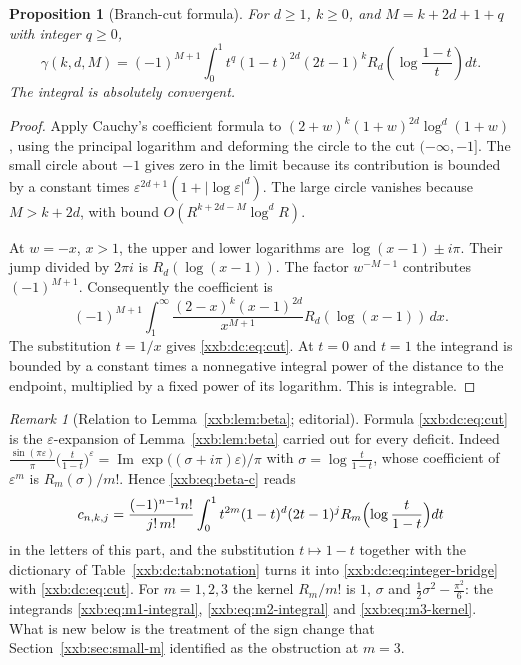 \documentclass[11pt,a4paper]{article}
\numberwithin{equation}{section}
\newtheorem{proposition}[theorem]{Proposition}
\theoremstyle{definition}
\theoremstyle{remark}
\newtheorem{remark}[theorem]{Remark}
\theoremstyle{plain}
\begin{document}
\begin{proposition}[Branch-cut formula]\label{xxb:dc:prop:integral}
For $d\ge1$, $k\ge0$, and $M=k+2d+1+q$ with integer $q\ge0$,
\begin{equation}\label{xxb:dc:eq:cut}
 \gamma(k,d,M)=(-1)^{M+1}
 \int_0^1 t^q(1-t)^{2d}(2t-1)^k
 R_d\!\left(\log\frac{1-t}{t}\right)dt.
\end{equation}
The integral is absolutely convergent.
\end{proposition}
\begin{proof}
Apply Cauchy's coefficient formula to
$(2+w)^k(1+w)^{2d}\log^d(1+w)$, using the principal logarithm and deforming
the circle to the cut $(-\infty,-1]$.  The small circle about $-1$ gives
zero in the limit because its contribution is bounded by a constant times
$\varepsilon^{2d+1}(1+|\log\varepsilon|^d)$.  The large circle vanishes
because $M>k+2d$, with bound $O(R^{k+2d-M}\log^d R)$.

At $w=-x$, $x>1$, the upper and lower logarithms are
$\log(x-1)\pm i\pi$.  Their jump divided by $2\pi i$ is
$R_d(\log(x-1))$.  The factor $w^{-M-1}$ contributes $(-1)^{M+1}$.
Consequently the coefficient is
\[
 (-1)^{M+1}\int_1^\infty
 \frac{(2-x)^k(x-1)^{2d}}{x^{M+1}}R_d(\log(x-1))\,dx.
\]
The substitution $t=1/x$ gives \eqref{xxb:dc:eq:cut}.  At $t=0$ and $t=1$ the
integrand is bounded by a constant times a nonnegative integral power
of the distance to the endpoint, multiplied by a fixed power of its
logarithm.  This is integrable.
\end{proof}

\begin{remark}[Relation to Lemma~\ref{xxb:lem:beta}; editorial]\label{xxb:dc:rem:beta}
Formula \eqref{xxb:dc:eq:cut} is the $\varepsilon$-expansion of
Lemma~\ref{xxb:lem:beta} carried out for every deficit.  Indeed
$\frac{\sin(\pi\varepsilon)}{\pi}\bigl(\tfrac{t}{1-t}\bigr)^{\varepsilon}
=\operatorname{Im}\exp\bigl((\sigma+i\pi)\varepsilon\bigr)/\pi$ with
$\sigma=\log\frac{t}{1-t}$, whose coefficient of $\varepsilon^m$ is
$R_m(\sigma)/m!$.  Hence \eqref{xxb:eq:beta-c} reads
\[
 c_{n,k,j}=\frac{(-1)^{n-1}n!}{j!\,m!}\int_0^1t^{2m}(1-t)^{d}(2t-1)^j
 R_m\Bigl(\log\frac{t}{1-t}\Bigr)dt
\]
in the letters of this part, and the substitution $t\mapsto1-t$ together with
the dictionary of Table~\ref{xxb:dc:tab:notation} turns it into
\eqref{xxb:dc:eq:integer-bridge} with \eqref{xxb:dc:eq:cut}.  For $m=1,2,3$ the
kernel $R_m/m!$ is $1$, $\sigma$ and
$\tfrac12\sigma^2-\tfrac{\pi^2}{6}$: the integrands
\eqref{xxb:eq:m1-integral}, \eqref{xxb:eq:m2-integral} and
\eqref{xxb:eq:m3-kernel}.  What is new below is the treatment of the sign change
that Section~\ref{xxb:sec:small-m} identified as the obstruction at $m=3$.
\end{remark}
\end{document}
